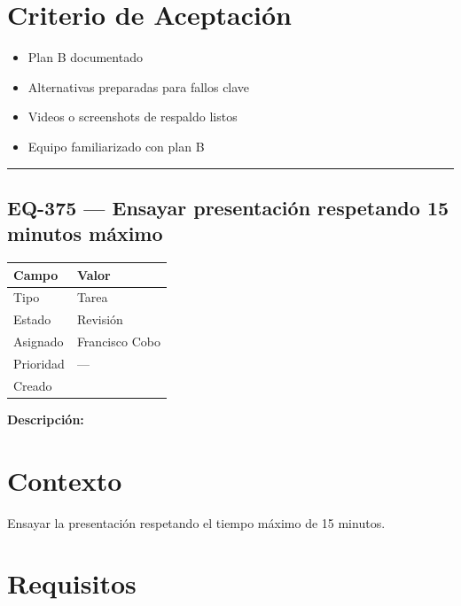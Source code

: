\documentclass[
  spanish,
  11pt,
]{report}
\newcounter{none} %
\providecommand{\tightlist}{%
  \setlength{\itemsep}{0pt}\setlength{\parskip}{0pt}}
\begin{document}
\section{Criterio de Aceptación}\label{criterio-de-aceptaciuxf3n-11}

\begin{itemize}
\tightlist
\item[$\square$]
  Plan B documentado
\item[$\square$]
  Alternativas preparadas para fallos clave
\item[$\square$]
  Videos o screenshots de respaldo listos
\item[$\square$]
  Equipo familiarizado con plan B
\end{itemize}

\begin{center}\rule{0.5\linewidth}{0.5pt}\end{center}

\subsection{EQ-375 --- Ensayar presentación respetando 15 minutos
máximo}\label{eq-375-ensayar-presentaciuxf3n-respetando-15-minutos-muxe1ximo}

{\def\LTcaptype{none} %
\begin{longtable}[]{@{}ll@{}}
\toprule\noalign{}
Campo & Valor \\
\midrule\noalign{}
\endhead
\bottomrule\noalign{}
\endlastfoot
Tipo & Tarea \\
Estado & Revisión \\
Asignado & Francisco Cobo \\
Prioridad & --- \\
Creado & \\
\end{longtable}
}

\textbf{Descripción:}

\section{Contexto}\label{contexto-13}

Ensayar la presentación respetando el tiempo máximo de 15 minutos.

\section{Requisitos}\label{requisitos-12}
\end{document}
